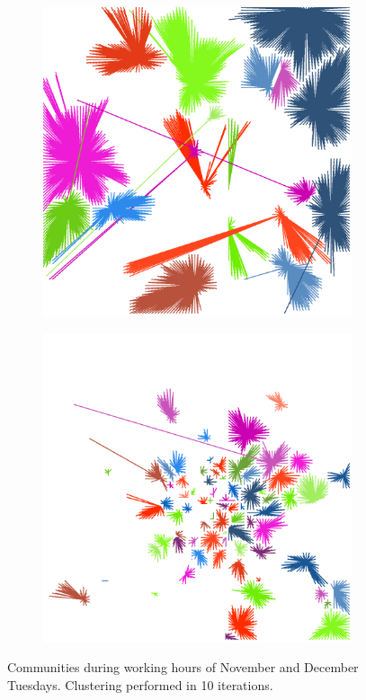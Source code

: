 \documentclass[12pt,a4paper]{article}
\begin{document}
\begin{figure}[H]
\begin{subfigure}[b]{0.3\textwidth}
\end{subfigure}
\begin{subfigure}[b]{0.3\textwidth}
\includegraphics[width=\textwidth]{weekDef/edges-2Tue-mid.png}
\end{subfigure}
\begin{subfigure}[b]{0.3\textwidth}
\includegraphics[width=\textwidth]{weekDef/edges-2Tue-small.png}
\end{subfigure}
\caption{Communities during working hours of November and December Tuesdays. Clustering performed in 10 iterations.}
\label{fig:tuesdayworking}
\end{figure}
\end{document}
